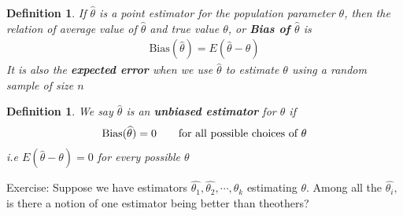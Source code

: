 \documentclass[11pt,oneside]{book}
\theoremstyle{newStyle}
\newtheorem{defn}[thm]{Definition}
\newcommand{\exercise}{\color{cyan}Exercise: \color{black}}
\begin{document}
\begin{defn}
If $\widehat{\theta}$ is a point estimator for the population parameter $\theta$, then the relation of average value of $\widehat{\theta}$ and true value $\theta$, or \textbf{Bias of $\widehat{\theta}$} is \begin{align*}
\text{Bias}(\widehat{\theta})=E(\widehat{\theta}-\theta)
\end{align*}
It is also the \textbf{expected error} when we use $\widehat{\theta}$ to estimate $\theta$ using a random sample of size $n$
\end{defn}
\begin{defn}
We say $\widehat{\theta}$ is an \textbf{unbiased estimator} for $\theta$ if \begin{align*}
\text{Bias}(\widehat{\theta})=0\text{\qquad for all possible choices of }\theta 
\end{align*}
i.e $E(\widehat{\theta}-\theta)=0$ for every possible $\theta$
\end{defn}
\exercise Suppose we have estimators $\widehat{\theta_1},\widehat{\theta_2},\cdots,\widehat{\theta_k}$ estimating $\theta$. Among all the $\widehat{\theta_i},$ is there a notion of one estimator being better than theothers?
\end{document}
